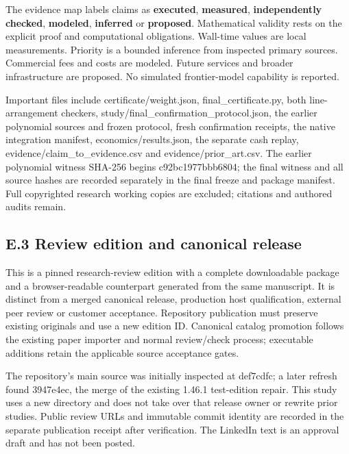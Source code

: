 \documentclass[11pt,a4paper]{article}
\renewcommand{\texttt}[1]{{\ttfamily\small #1}}
\begin{document}
The evidence map labels claims as \textbf{executed}, \textbf{measured},
\textbf{independently checked}, \textbf{modeled}, \textbf{inferred} or
\textbf{proposed}. Mathematical validity rests on the explicit proof and
computational obligations. Wall-time values are local measurements.
Priority is a bounded inference from inspected primary sources.
Commercial fees and costs are modeled. Future services and broader
infrastructure are proposed. No simulated frontier-model capability is
reported.

Important files include \texttt{certificate/weight.json},
\texttt{final\_certificate.py}, both line-arrangement checkers,
\texttt{study/final\_confirmation\_protocol.json}, the earlier
polynomial sources and frozen protocol, fresh confirmation receipts, the
native integration manifest, \texttt{economics/results.json}, the
separate cash replay, \texttt{evidence/claim\_to\_evidence.csv} and
\texttt{evidence/prior\_art.csv}. The earlier polynomial witness SHA-256
begins \texttt{c92bc1977bbb6804}; the final witness and all source
hashes are recorded separately in the final freeze and package manifest.
Full copyrighted research working copies are excluded; citations and
authored audits remain.


\hypertarget{e.3-review-edition-and-canonical-release}{%
\subsection{E.3 Review edition and canonical
release}\label{e.3-review-edition-and-canonical-release}}

This is a pinned research-review edition with a complete downloadable
package and a browser-readable counterpart generated from the same
manuscript. It is distinct from a merged canonical release, production
host qualification, external peer review or customer acceptance.
Repository publication must preserve existing originals and use a new
edition ID. Canonical catalog promotion follows the existing paper
importer and normal review/check process; executable additions retain
the applicable source acceptance gates.

The repository's main source was initially inspected at
\texttt{def7cdfc}; a later refresh found \texttt{3947e4ec}, the merge of
the existing 1.46.1 test-edition repair. This study uses a new directory
and does not take over that release owner or rewrite prior studies.
Public review URLs and immutable commit identity are recorded in the
separate publication receipt after verification. The LinkedIn text is an
approval draft and has not been posted.
\end{document}
